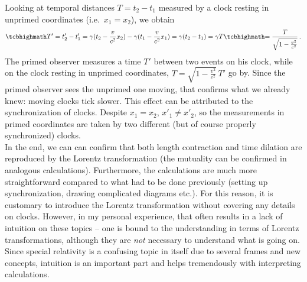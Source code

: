 
Looking at temporal distances $T = t_2 - t_1$ measured by a clock resting in unprimed coordinates (i.e.~$x_1 = x_2$), we obtain
\begin{equation}
\eqbox{T'} = t'_2 - t'_1 = \gamma (t_2 - \frac{v}{c^2} x_2) - \gamma (t_1 - \frac{v}{c^2} x_1) = \gamma (t_2 - t_1) = \gamma T \eqbox{= \frac{T}{\sqrt{1 - \frac{v^2}{c^2}}}} \, .
\end{equation}
The primed observer measures a time $T'$ between two events on his clock, while on the clock resting in unprimed coordinates, $T = \sqrt{1 - \frac{v^2}{c^2}} \, T'$ go by. Since the primed observer sees the unprimed one moving, that confirms what we already knew: moving clocks tick slower. This effect can be attributed to the synchronization of clocks. Despite $x_1 = x_2$, $x'_1 \neq x'_2$, so the measurements in primed coordinates are taken by two different (but of course properly synchronized) clocks.\\


In the end, we can can confirm that both length contraction and time dilation are reproduced by the Lorentz transformation (the mutuality can be confirmed in analogous calculations). Furthermore, the calculations are much more straightforward compared to what had to be done previously (setting up synchronization, drawing complicated diagrams etc.). For this reason, it is customary to introduce the Lorentz transformation without covering any details on clocks. However, in my personal experience, that often results in a lack of intuition on these topics -- one is bound to the understanding in terms of Lorentz transformations, although they are \emph{not} necessary to understand what is going on. Since special relativity is a confusing topic in itself due to several frames and new concepts, intuition is an important part and helps tremendously with interpreting calculations.




